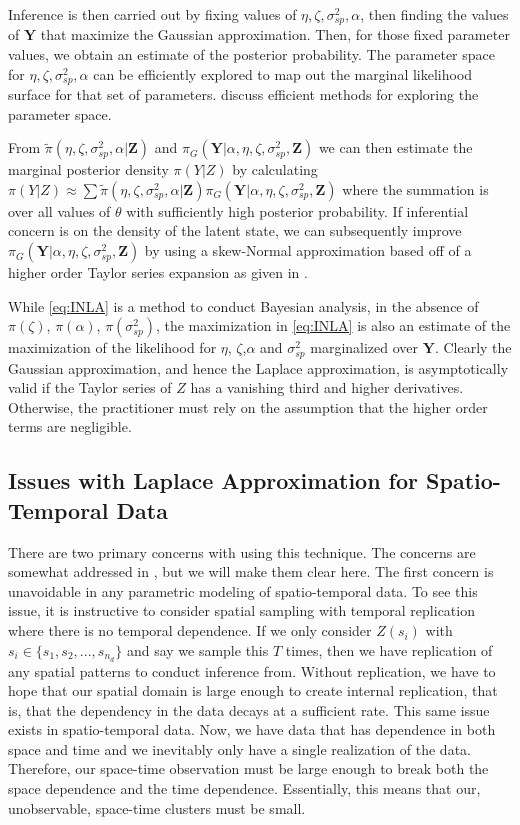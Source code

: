 \documentclass[11pt]{isuthesis}
\begin{document}
	Inference is then carried out by fixing values of $\eta,\zeta,\sigma_{sp}^2,\alpha$, then finding the values of $\boldsymbol{Y}$ that maximize the Gaussian approximation.  Then, for those fixed parameter values, we obtain an estimate of the posterior probability.  The parameter space for $\eta,\zeta,\sigma_{sp}^2,\alpha$ can be efficiently explored to map out the marginal likelihood surface for that set of parameters.  \cite{rue2009approximate} discuss efficient methods for exploring the parameter space.
	
	From $\tilde{\pi}(\eta,\zeta,\sigma_{sp}^2,\alpha|\boldsymbol{Z})$ and $\pi_G(\boldsymbol{Y}|\alpha,\eta,\zeta,\sigma_{sp}^2,\boldsymbol{Z})$ we can then estimate the marginal posterior density $\pi(Y|Z)$ by calculating $\pi(Y|Z) \approx \sum\tilde{\pi}(\eta,\zeta,\sigma_{sp}^2,\alpha|\boldsymbol{Z})\pi_G(\boldsymbol{Y}|\alpha,\eta,\zeta,\sigma_{sp}^2,\boldsymbol{Z})$ where the summation is over all values of $\theta$ with sufficiently high posterior probability.  If inferential concern is on the density of the latent state, we can subsequently improve $\pi_G(\boldsymbol{Y}|\alpha,\eta,\zeta,\sigma_{sp}^2,\boldsymbol{Z})$ by using a skew-Normal approximation based off of a higher order Taylor series expansion as given in \cite{rue2009approximate}.
	
	While \eqref{eq:INLA} is a method to conduct Bayesian analysis, in the absence of $\pi(\zeta)$, $\pi(\alpha)$, $\pi(\sigma_{sp}^2)$, the maximization in \eqref{eq:INLA} is also an estimate of the maximization of the likelihood for $\eta$, $\zeta$,$\alpha$ and $\sigma_{sp}^2$ marginalized over $\boldsymbol{Y}$.  Clearly the Gaussian approximation, and hence the Laplace approximation, is asymptotically valid if the Taylor series of $Z$ has a vanishing third and higher derivatives.  Otherwise, the practitioner must rely on the assumption that the higher order terms are negligible. 
	
	\subsection{Issues with Laplace Approximation for Spatio-Temporal Data}
	There are two primary concerns with using this technique.  The concerns are somewhat addressed in \cite{rue2009approximate}, but we will make them clear here.  The first concern is unavoidable in any parametric modeling of spatio-temporal data.  To see this issue, it is instructive to consider spatial sampling with temporal replication where there is no temporal dependence.  If we only consider $Z(s_i)$ with $s_i\in \{s_1,s_2,...,s_{n_d}\}$ and say we sample this $T$ times, then we have replication of any spatial patterns to conduct inference from.  Without replication, we have to hope that our spatial domain is large enough to create internal replication, that is, that the dependency in the data decays at a sufficient rate.  This same issue exists in spatio-temporal data.  Now, we have data that has dependence in both space and time and we inevitably only have a single realization of the data.  Therefore, our space-time observation must be large enough to break both the space dependence and the time dependence.  Essentially, this means that our, unobservable, space-time clusters must be small.
	
\end{document}
